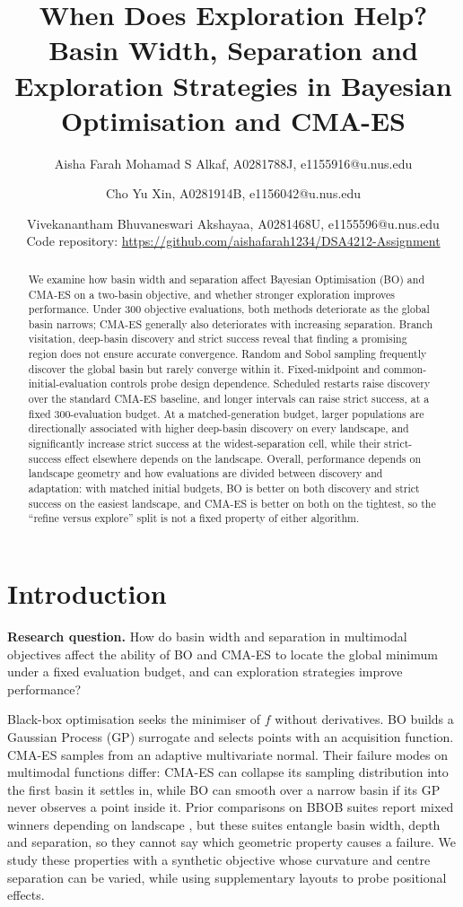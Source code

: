 \documentclass[11pt,a4paper]{article}
\title{\textbf{When Does Exploration Help? Basin Width, Separation and Exploration Strategies in Bayesian Optimisation and CMA-ES}}
\author{Aisha Farah Mohamad S Alkaf, A0281788J, e1155916@u.nus.edu \and Cho Yu Xin, A0281914B, e1156042@u.nus.edu \and Vivekanantham Bhuvaneswari Akshayaa, A0281468U, e1155596@u.nus.edu\\[4pt]
\small Code repository: \url{https://github.com/aishafarah1234/DSA4212-Assignment}}
\date{}
\begin{document}
\maketitle

\begin{abstract}
We examine how basin width and separation affect Bayesian Optimisation (BO) and CMA-ES on a two-basin objective, and whether stronger exploration improves performance. Under 300 objective evaluations, both methods deteriorate as the global basin narrows; CMA-ES generally also deteriorates with increasing separation. Branch visitation, deep-basin discovery and strict success reveal that finding a promising region does not ensure accurate convergence. Random and Sobol sampling frequently discover the global basin but rarely converge within it. Fixed-midpoint and common-initial-evaluation controls probe design dependence. Scheduled restarts raise discovery over the standard CMA-ES baseline, and longer intervals can raise strict success, at a fixed 300-evaluation budget. At a matched-generation budget, larger populations are directionally associated with higher deep-basin discovery on every landscape, and significantly increase strict success at the widest-separation cell, while their strict-success effect elsewhere depends on the landscape. Overall, performance depends on landscape geometry and how evaluations are divided between discovery and adaptation: with matched initial budgets, BO is better on both discovery and strict success on the easiest landscape, and CMA-ES is better on both on the tightest, so the ``refine versus explore'' split is not a fixed property of either algorithm.
\end{abstract}

\section{Introduction}

\textbf{Research question.} How do basin width and separation in multimodal objectives affect the ability of BO and CMA-ES to locate the global minimum under a fixed evaluation budget, and can exploration strategies improve performance?

Black-box optimisation seeks the minimiser of $f$ without derivatives. BO builds a Gaussian Process (GP) surrogate and selects points with an acquisition function. CMA-ES samples from an adaptive multivariate normal. Their failure modes on multimodal functions differ: CMA-ES can collapse its sampling distribution into the first basin it settles in, while BO can smooth over a narrow basin if its GP never observes a point inside it. Prior comparisons on BBOB suites report mixed winners depending on landscape \cite{crebolder,santoni}, but these suites entangle basin width, depth and separation, so they cannot say which geometric property causes a failure. We study these properties with a synthetic objective whose curvature and centre separation can be varied, while using supplementary layouts to probe positional effects.
\end{document}
